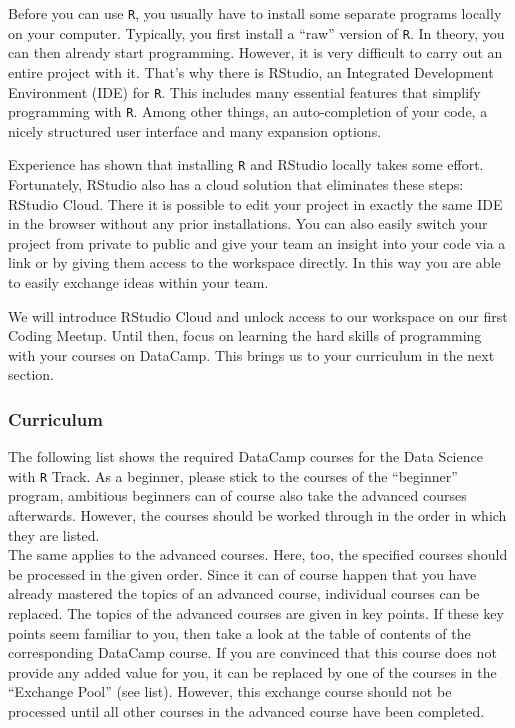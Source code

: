 \documentclass[
  11pt,
]{article}
\begin{document}
Before you can use \texttt{R}, you usually have to install some separate programs locally on your computer. Typically, you first install a ``raw'' version of \texttt{R}. In theory, you can then already start programming. However, it is very difficult to carry out an entire project with it. That's why there is RStudio, an Integrated Development Environment (IDE) for \texttt{R}. This includes many essential features that simplify programming with \texttt{R}. Among other things, an auto-completion of your code, a nicely structured user interface and many expansion options.

Experience has shown that installing \texttt{R} and RStudio locally takes some effort. Fortunately, RStudio also has a cloud solution that eliminates these steps: RStudio Cloud. There it is possible to edit your project in exactly the same IDE in the browser without any prior installations. You can also easily switch your project from private to public and give your team an insight into your code via a link or by giving them access to the workspace directly. In this way you are able to easily exchange ideas within your team.

We will introduce RStudio Cloud and unlock access to our workspace on our first Coding Meetup. Until then, focus on learning the hard skills of programming with your courses on DataCamp. This brings us to your curriculum in the next section.

\hypertarget{curriculum}{%
\subsubsection{Curriculum}\label{curriculum}}

The following list shows the required DataCamp courses for the Data Science with \texttt{R} Track. As a beginner, please stick to the courses of the ``beginner'' program, ambitious beginners can of course also take the advanced courses afterwards. However, the courses should be worked through in the order in which they are listed.\\
The same applies to the advanced courses. Here, too, the specified courses should be processed in the given order. Since it can of course happen that you have already mastered the topics of an advanced course, individual courses can be replaced. The topics of the advanced courses are given in key points. If these key points seem familiar to you, then take a look at the table of contents of the corresponding DataCamp course. If you are convinced that this course does not provide any added value for you, it can be replaced by one of the courses in the ``Exchange Pool'' (see list). However, this exchange course should not be processed until all other courses in the advanced course have been completed.
\end{document}
